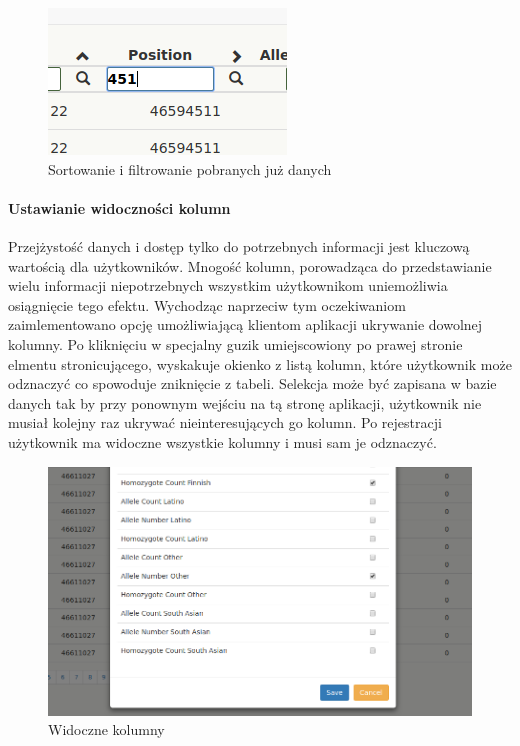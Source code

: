 \documentclass[a4paper,12pt,twoside]{article}
\begin{document}
\begin{figure}[h]
\centering
  \includegraphics{obrazy/aplikacja/sortingAndSearch.png}
  \caption{Sortowanie i filtrowanie pobranych już danych}
  \label{fig:sortingAndSearchpic}
\end{figure}

\newpage
\paragraph{Ustawianie widoczności kolumn}
Przejżystość danych i dostęp tylko do potrzebnych informacji jest kluczową wartością dla użytkowników.
Mnogość kolumn, porowadząca do przedstawianie wielu informacji niepotrzebnych 
wszystkim użytkownikom uniemożliwia osiągnięcie tego efektu. Wychodząc naprzeciw tym oczekiwaniom 
zaimlementowano opcję umożliwiającą klientom aplikacji ukrywanie dowolnej kolumny.
Po kliknięciu w specjalny guzik umiejscowiony po prawej stronie elmentu stronicującego, wyskakuje okienko z listą kolumn,
które użytkownik może odznaczyć co spowoduje zniknięcie z tabeli. Selekcja może być zapisana 
w bazie danych tak by przy ponownym wejściu na tą stronę aplikacji, użytkownik nie musiał
kolejny raz ukrywać nieinteresujących go kolumn. Po rejestracji użytkownik ma widoczne wszystkie
kolumny i musi sam je odznaczyć.

\begin{figure}[h]
  \includegraphics[width=\linewidth]{obrazy/aplikacja/visible_columns.png}
  \caption{Widoczne kolumny}
  \label{fig:visible_columnspic}
\end{figure}
\end{document}
